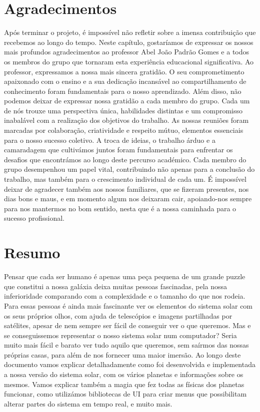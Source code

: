 \chapter*{Agradecimentos}
\label{chap:ack}
\vspace{0.7cm}

Após terminar o projeto, é impossível não refletir sobre a imensa contribuição que recebemos ao longo do tempo. Neste capítulo, gostaríamos de expressar os nossos mais profundos 
agradecimentos ao professor Abel João Padrão Gomes e a todos os membros do grupo que tornaram esta experiência educacional significativa. Ao professor, expressamos a nossa mais sincera gratidão. O seu comprometimento apaixonado com o ensino e a sua dedicação incansável ao compartilhamento de conhecimento foram fundamentais para o nosso aprendizado. Além disso, não podemos deixar de expressar nossa gratidão a cada membro do grupo. Cada um de nós trouxe uma perspectiva única, habilidades distintas e um compromisso inabalável com a realização dos objetivos do trabalho.
As nossas reuniões foram marcadas por colaboração, criatividade e respeito mútuo, elementos essenciais para o nosso sucesso coletivo. A troca de ideias, o trabalho árduo e a camaradagem que cultivámos juntos foram fundamentais para enfrentar os desafios que encontrámos ao longo deste percurso académico. Cada membro do grupo desempenhou um papel vital, contribuindo não apenas para a conclusão do trabalho, mas também para o crescimento individual de cada um. É impossível deixar de agradecer também aos nossos familiares, que se fizeram presentes, nos dias bons e maus, e em momento algum nos deixaram cair, apoiando-nos sempre para nos mantermos no bom sentido, nesta que é a nossa caminhada para o sucesso profissional.

\chapter*{Resumo}
\label{chap:res}
\vspace{0.7cm}

Pensar que cada ser humano é apenas uma peça pequena de um grande puzzle que constitui a nossa galáxia deixa muitas pessoas fascinadas, pela nossa inferioridade comparando com a complexidade e o tamanho do que nos rodeia. Para essas pessoas é ainda mais fascinante ver os elementos do sistema solar com os seus próprios olhos, com ajuda de telescópios e imagens partilhadas por satélites, apesar de nem sempre ser fácil de conseguir ver o que queremos. Mas e se conseguissemos representar o nosso sistema solar num computador? Seria muito mais fácil e barato ver tudo aquilo que queremos, sem saírmos das nossas próprias casas, para além de nos fornecer uma maior imersão.
Ao longo deste documento vamos explicar detalhadamente como foi desenvolvida e implementada a nossa versão do sistema solar, com os vários planetas e informações sobre os mesmos. Vamos explicar também a magia que fez todas as físicas dos planetas funcionar, como utilizámos bibliotecas de \ac{UI} para criar menus que possibilitam alterar partes do sistema em tempo real, e muito mais.
